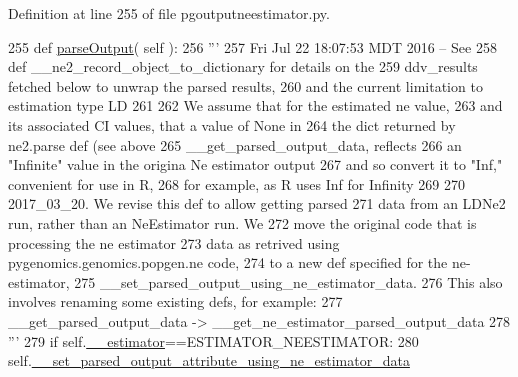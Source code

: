 Definition at line 255 of file pgoutputneestimator.\+py.


\begin{DoxyCode}
255     \textcolor{keyword}{def }\hyperlink{classnegui_1_1pgoutputneestimator_1_1PGOutputNeEstimator_a7b6885cf565cb604ab24d7082858f57b}{parseOutput}( self ):
256         \textcolor{stringliteral}{'''}
257 \textcolor{stringliteral}{        Fri Jul 22 18:07:53 MDT 2016 -- See }
258 \textcolor{stringliteral}{        def \_\_ne2\_record\_object\_to\_dictionary for details on the}
259 \textcolor{stringliteral}{        ddv\_results fetched below to unwrap the parsed results,}
260 \textcolor{stringliteral}{        and the current limitation to estimation type LD}
261 \textcolor{stringliteral}{}
262 \textcolor{stringliteral}{        We assume that for the estimated ne value,}
263 \textcolor{stringliteral}{        and its associated CI values, that a value of None in}
264 \textcolor{stringliteral}{        the dict returned by ne2.parse def (see above }
265 \textcolor{stringliteral}{        \_\_get\_parsed\_output\_data, reflects}
266 \textcolor{stringliteral}{        an "Infinite" value in the origina Ne estimator output}
267 \textcolor{stringliteral}{        and so convert it to "Inf,"  convenient for use in R,}
268 \textcolor{stringliteral}{        for example, as R uses Inf for Infinity}
269 \textcolor{stringliteral}{        }
270 \textcolor{stringliteral}{        2017\_03\_20.  We revise this def to allow getting parsed }
271 \textcolor{stringliteral}{        data from an LDNe2 run, rather than an NeEstimator run. We }
272 \textcolor{stringliteral}{        move the original code that is processing the ne estimator}
273 \textcolor{stringliteral}{        data as retrived using pygenomics.genomics.popgen.ne code,}
274 \textcolor{stringliteral}{        to a new def specified for the ne-estimator, }
275 \textcolor{stringliteral}{        \_\_set\_parsed\_output\_using\_ne\_estimator\_data.}
276 \textcolor{stringliteral}{        This also involves renaming some existing defs, for example:}
277 \textcolor{stringliteral}{            \_\_get\_parsed\_output\_data -> \_\_get\_ne\_estimator\_parsed\_output\_data}
278 \textcolor{stringliteral}{        '''}
279         \textcolor{keywordflow}{if} self.\hyperlink{classnegui_1_1pgoutputneestimator_1_1PGOutputNeEstimator_a4d34bdc2e4c4fdc788722b016348c6ee}{\_\_estimator}==ESTIMATOR\_NEESTIMATOR:
280             self.\hyperlink{classnegui_1_1pgoutputneestimator_1_1PGOutputNeEstimator_a10df28bc24347e441b225c3e5a7f3630}{\_\_set\_parsed\_output\_attribute\_using\_ne\_estimator\_data}

\end{DoxyCode}
